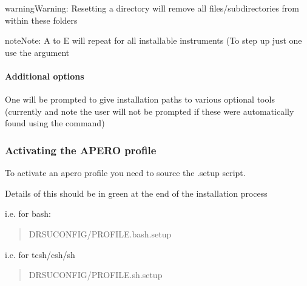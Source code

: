 \documentclass[a4paper,10pt,english]{report}
\begin{document}
\begin{sphinxadmonition}{warning}{Warning:}
Resetting a directory will remove all files/sub\sphinxhyphen{}directories from within these folders
\end{sphinxadmonition}

\begin{sphinxadmonition}{note}{Note:}
A to E will repeat for all installable instruments (To step up just one use the  argument
\end{sphinxadmonition}


\paragraph{Additional options}
\label{\detokenize{user/general/installation:additional-options}}
One will be prompted to give installation paths to various optional tools (currently {\hyperref[\detokenize{misc/glossary:term-ds9}]{}}
and {\hyperref[\detokenize{misc/glossary:term-pdflatex}]{}}
note the user will not be prompted if these were automatically found using the 
command)


\subsubsection{Activating the APERO profile}
\label{\detokenize{user/general/installation:activating-the-apero-profile}}\label{\detokenize{user/general/installation:installation-activate}}
To activate an apero profile you need to source the .setup script.

Details of this should be in green at the end of the installation process

i.e. for bash:
\begin{quote}

\begin{sphinxVerbatim}[commandchars=\\\{\}]
 DRS\PYGZus{}UCONFIG/PROFILE.bash.setup
\end{sphinxVerbatim}
\end{quote}

i.e. for tcsh/csh/sh
\begin{quote}

\begin{sphinxVerbatim}[commandchars=\\\{\}]
 DRS\PYGZus{}UCONFIG/PROFILE.sh.setup
\end{sphinxVerbatim}
\end{quote}
\end{document}
